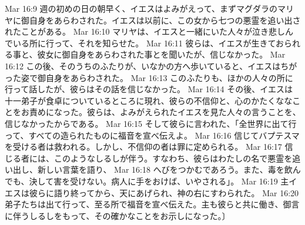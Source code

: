 Mar 16:9  週の初めの日の朝早く、イエスはよみがえって、まずマグダラのマリヤに御自身をあらわされた。イエスは以前に、この女から七つの悪霊を追い出されたことがある。
Mar 16:10  マリヤは、イエスと一緒にいた人々が泣き悲しんでいる所に行って、それを知らせた。
Mar 16:11  彼らは、イエスが生きておられる事と、彼女に御自身をあらわされた事とを聞いたが、信じなかった。
Mar 16:12  この後、そのうちのふたりが、いなかの方へ歩いていると、イエスはちがった姿で御自身をあらわされた。
Mar 16:13  このふたりも、ほかの人々の所に行って話したが、彼らはその話を信じなかった。
Mar 16:14  その後、イエスは十一弟子が食卓についているところに現れ、彼らの不信仰と、心のかたくななことをお責めになった。彼らは、よみがえられたイエスを見た人々の言うことを、信じなかったからである。
Mar 16:15  そして彼らに言われた、「全世界に出て行って、すべての造られたものに福音を宣べ伝えよ。
Mar 16:16  信じてバプテスマを受ける者は救われる。しかし、不信仰の者は罪に定められる。
Mar 16:17  信じる者には、このようなしるしが伴う。すなわち、彼らはわたしの名で悪霊を追い出し、新しい言葉を語り、
Mar 16:18  へびをつかむであろう。また、毒を飲んでも、決して害を受けない。病人に手をおけば、いやされる」。
Mar 16:19  主イエスは彼らに語り終ってから、天にあげられ、神の右にすわられた。
Mar 16:20  弟子たちは出て行って、至る所で福音を宣べ伝えた。主も彼らと共に働き、御言に伴うしるしをもって、その確かなことをお示しになった。〕


